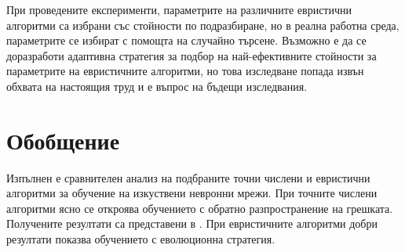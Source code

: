 При проведените експерименти, параметрите на различните евристични алгоритми са избрани със стойности по подразбиране, но в реална работна среда, параметрите се избират с помощта на случайно търсене. Възможно е да се доразработи адаптивна стратегия за подбор на най-ефективните стойности за параметрите на евристичните алгоритми, но това изследване попада извън обхвата на настоящия труд и е въпрос на бъдещи изследвания. 

\section{Обобщение}

Изпълнен е сравнителен анализ на подбраните точни числени и евристични алгоритми за обучение на изкуствени невронни мрежи. При точните числени алгоритми ясно се откроява обучението с обратно разпространение на грешката. Получените резултати са представени в \cite{Tomov-08}. При евристичните алгоритми добри резултати показва обучението с еволюционна стратегия.

